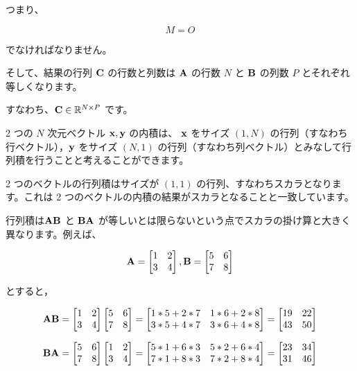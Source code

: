 つまり、


\[
M = O
\]


でなければなりません。

そして、結果の行列 ${\bf C}$ の行数と列数は ${\bf A}$ の行数 $N$ と ${\bf B}$ の列数 $P$ とそれぞれ等しくなります。

すなわち、${\bf C} \in \mathbb{R}^{N \times P}$ です。


2 つの $N$ 次元ベクトル ${\bf x}, {\bf y}$ の内積は、 ${\bf x}$ をサイズ $(1, N)$ の行列（すなわち行ベクトル），${\bf y}$ をサイズ $(N, 1)$ の行列（すなわち列ベクトル）とみなして行列積を行うことと考えることができます。

2 つのベクトルの行列積はサイズが $(1, 1)$ の行列、すなわちスカラとなります。これは 2 つのベクトルの内積の結果がスカラとなることと一致しています。




行列積は${\bf AB}$ と ${\bf BA}$ が等しいとは限らないという点でスカラの掛け算と大きく異なります。例えば、


\[
{\bf A} = \begin{bmatrix}
1 & 2 \\
3 & 4
\end{bmatrix},
{\bf B} = \begin{bmatrix}
5 & 6 \\
7 & 8
\end{bmatrix}
\]


とすると，


\[
{\bf AB} = \begin{bmatrix}
1 & 2 \\
3 & 4
\end{bmatrix}
\begin{bmatrix}
5 & 6 \\
7 & 8
\end{bmatrix} =
\begin{bmatrix}
1 * 5 + 2 * 7 & 1 * 6 + 2 * 8 \\
3 * 5 + 4 * 7 & 3 * 6 + 4 * 8
\end{bmatrix} =
\begin{bmatrix}
19 & 22 \\
43 & 50
\end{bmatrix}
\]


\[
{\bf BA} = \begin{bmatrix}
5 & 6 \\
7 & 8
\end{bmatrix}
\begin{bmatrix}
1 & 2 \\
3 & 4
\end{bmatrix} =
\begin{bmatrix}
5 * 1 + 6 * 3 & 5 * 2 + 6 * 4 \\
7 * 1 + 8 * 3 & 7 * 2 + 8 * 4
\end{bmatrix} =
\begin{bmatrix}
23 & 34 \\
31 & 46
\end{bmatrix}
\]


